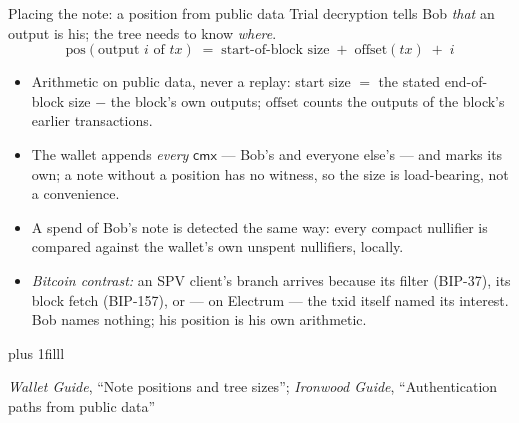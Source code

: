 \documentclass[aspectratio=169,11pt]{beamer}
\newcommand{\cmx}{\ensuremath{\mathsf{cmx}}}
\newcommand{\src}[1]{\par\vskip0pt plus 1filll
  {\fontsize{6}{7.2}\selectfont\color{arbdim}\raggedright #1\par}}
\begin{document}
\begin{frame}{Placing the note: a position from public data}
Trial decryption tells Bob \emph{that} an output is his; the tree needs
to know \emph{where}.
\[
\mathrm{pos}(\text{output } i \text{ of } tx) \;=\;
  \text{start-of-block size} \;+\; \mathrm{offset}(tx) \;+\; i
\]
\begin{itemize}
  \item Arithmetic on public data, never a replay: start size $=$ the
    stated end-of-block size $-$ the block's own outputs; $\mathrm{offset}$
    counts the outputs of the block's earlier transactions.
  \item The wallet appends \emph{every} \cmx{} --- Bob's and everyone
    else's --- and marks its own; a note without a position has no
    witness, so the size is load-bearing, not a convenience.
  \item A spend of Bob's note is detected the same way: every compact
    nullifier is compared against the wallet's own unspent nullifiers,
    locally.
  \item \emph{Bitcoin contrast:} an SPV client's branch arrives because
    its filter (BIP-37), its block fetch (BIP-157), or --- on Electrum
    --- the txid itself named its interest. Bob names nothing; his
    position is his own arithmetic.
\end{itemize}
\src{\emph{Wallet Guide}, ``Note positions and tree sizes'';
  \emph{Ironwood Guide}, ``Authentication paths from public data''}
\end{frame}
\end{document}
